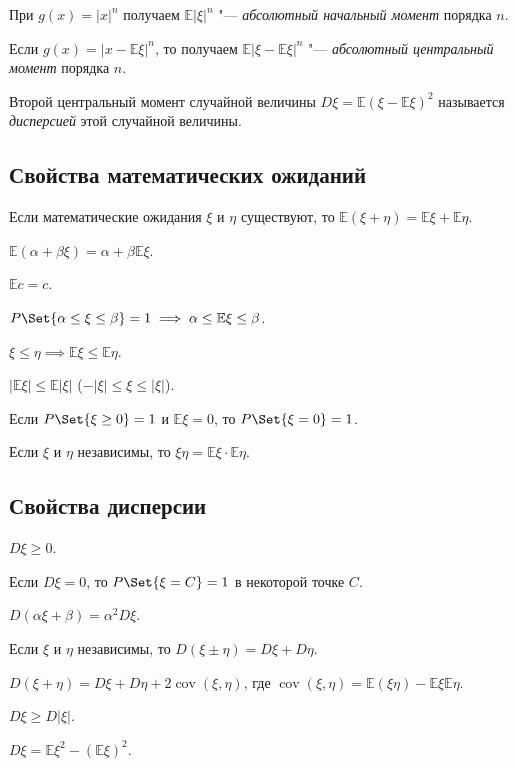\begin{definition}
	При $ g(x) = |x|^n $ получаем $ \mathbb E|\xi|^n $ "--- \emph{абсолютный начальный момент}
	порядка $ n $.
\end{definition}

\begin{definition}
	Если $ g(x) = |x - \mathbb E \xi|^n $, то получаем $ \mathbb E|\xi - \mathbb E \xi|^n $ "---
	\emph{абсолютный центральный момент} порядка $ n $.
\end{definition}

\begin{definition}
	Второй центральный момент случайной величины $ D \xi = \mathbb E(\xi - \mathbb E \xi)^2 $
	называется \emph{дисперсией} этой случайной величины.
\end{definition}

\subsection{Свойства математических ожиданий}

\begin{props}
\item Если математические ожидания $ \xi $ и $ \eta $ существуют, то
	$ \mathbb E(\xi + \eta) = \mathbb E \xi + \mathbb E \eta $.
\item $ \mathbb E(\alpha + \beta \xi) = \alpha + \beta \mathbb E\xi $.
\item $ \mathbb E c = c $.
\item $ P\Set{\alpha \le \xi \le \beta} = 1 \implies \alpha \le \mathbb E \xi \le \beta $.
\item $ \xi \le \eta \implies \mathbb E \xi \le \mathbb E \eta $.
\item $ |\mathbb E \xi| \le \mathbb E |\xi| $ (\as $ -|\xi| \le \xi \le |\xi| $).
\item Если $ P \Set{\xi \ge 0} = 1 $ и $ \mathbb E \xi = 0 $, то $ P\Set{\xi = 0} = 1 $.
\item Если $ \xi $ и $ \eta $ независимы, то $ \mathbb \xi \eta =
	\mathbb E \xi \cdot \mathbb E \eta $.
\end{props}

\subsection{Свойства дисперсии}

\begin{props}
\item $ D\xi \ge 0 $.
\item Если $ D \xi = 0 $, то $ P\Set{\xi = C} = 1 $ в некоторой точке $ C $.
\item $ D(\alpha \xi + \beta) = \alpha^2 D\xi $.
\item Если $ \xi $ и $ \eta $ независимы, то $ D(\xi \pm \eta) = D\xi + D\eta $.
\item $ D(\xi + \eta) = D\xi + D\eta + 2 \operatorname{cov}(\xi, \eta) $, где
    $ \operatorname{cov}(\xi, \eta) = \mathbb E(\xi \eta) - \mathbb E \xi \mathbb E \eta $.
\item $ D\xi \ge D|\xi| $.
\item $ D \xi = \mathbb E\xi^2 - (\mathbb E \xi)^2 $.
\end{props}

